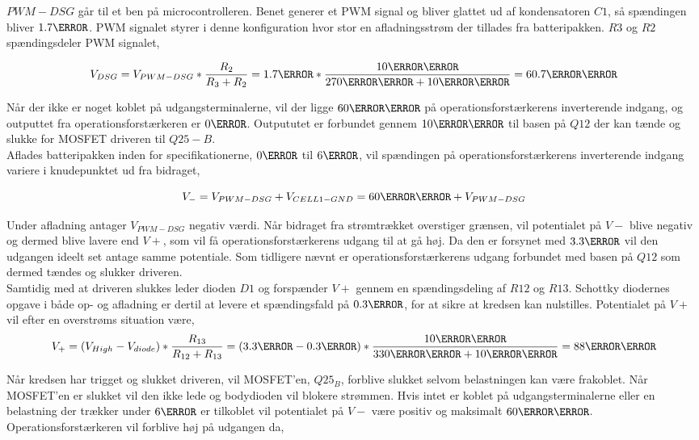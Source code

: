 $PWM-DSG$ går til et ben på microcontrolleren. Benet generer et PWM signal og bliver glattet ud af kondensatoren $C1$, så spændingen bliver $1.7\volt$. PWM signalet styrer i denne konfiguration hvor stor en afladningsstrøm der tillades fra batteripakken. $R3$ og $R2$ spændingsdeler PWM signalet,

\begin {equation} 
V_{DSG} = V_{PWM-DSG} * \frac{R_{2}}{R_{3}+R_{2}} = 1.7\volt * \frac{10\kilo\ohm}{270\kilo\ohm + 10\kilo\ohm} = 60.7\milli\volt
\end {equation}

Når der ikke er noget koblet på udgangsterminalerne, vil der ligge $60\milli\volt$ på operationsforstærkerens inverterende indgang, og outputtet fra operationsforstærkeren er $0\volt$. Outpututet er forbundet gennem $10\kilo\ohm$ til basen på $Q12$ der kan tænde og slukke for MOSFET driveren til $Q25-B$.
\\

Aflades batteripakken inden for specifikationerne, $0\ampere$ til $6\ampere$, vil spændingen på operationsforstærkerens inverterende indgang variere i knudepunktet ud fra bidraget,

\begin {equation} 
V_{-} = V_{PWM-DSG} + V_{CELL1-GND} = 60\milli\volt + V_{PWM-DSG}
\end {equation}

Under afladning antager $V_{PWM-DSG}$ negativ værdi. Når bidraget fra  strømtrækket overstiger grænsen, vil potentialet på $V-$ blive negativ og dermed blive lavere end $V+$, som vil få operationsforstærkerens udgang til at gå høj. Da den er forsynet med $3.3\volt$ vil den udgangen ideelt set antage samme potentiale. Som tidligere nævnt er operationsforstærkerens udgang forbundet med basen på $Q12$ som dermed tændes og slukker driveren.
\\
Samtidig med at driveren slukkes leder dioden $D1$ og forspænder $V+$ gennem en spændingsdeling af $R12$ og $R13$. Schottky diodernes opgave i både op- og afladning er dertil at levere et spændingsfald på $0.3\volt$, for at sikre at kredsen kan nulstilles. Potentialet på $V+$ vil efter en overstrøms situation være,
\begin {equation} 
V_{+} = (V_{High} - V_{diode} ) * \frac{R_{13}}{R_{12}+R_{13}} = (3.3\volt - 0.3\volt ) * \frac{10\kilo\ohm}{330\kilo\ohm + 10\kilo\ohm} =  88\milli\volt
\end {equation}

Når kredsen har trigget og slukket driveren, vil MOSFET'en, $Q25_B$, forblive slukket selvom belastningen kan være frakoblet. Når MOSFET'en er slukket vil den ikke lede og bodydioden vil blokere strømmen.
Hvis intet er koblet på udgangsterminalerne eller en belastning der trækker under $6\ampere$ er tilkoblet vil potentialet på $V-$ være positiv og maksimalt $60\milli\volt$. Operationsforstærkeren vil forblive høj på udgangen da,

